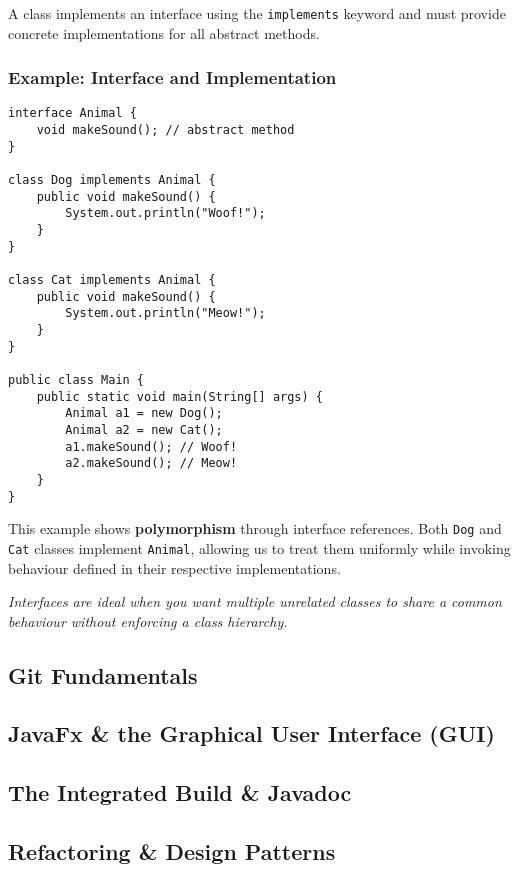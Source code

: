 \documentclass{article}
\begin{document}
A class implements an interface using the \texttt{implements} keyword and must provide concrete implementations for all abstract methods.

\subsubsection*{Example: Interface and Implementation}

\begin{verbatim}
interface Animal {
    void makeSound(); // abstract method
}

class Dog implements Animal {
    public void makeSound() {
        System.out.println("Woof!");
    }
}

class Cat implements Animal {
    public void makeSound() {
        System.out.println("Meow!");
    }
}

public class Main {
    public static void main(String[] args) {
        Animal a1 = new Dog();
        Animal a2 = new Cat();
        a1.makeSound(); // Woof!
        a2.makeSound(); // Meow!
    }
}
\end{verbatim}

This example shows \textbf{polymorphism} through interface references. Both \texttt{Dog} and \texttt{Cat} classes implement \texttt{Animal}, allowing us to treat them uniformly while invoking behaviour defined in their respective implementations.

\medskip
\textit{Interfaces are ideal when you want multiple unrelated classes to share a common behaviour without enforcing a class hierarchy.}



\subsection{Git Fundamentals}

\subsection{JavaFx \& the Graphical User Interface (GUI)}

\subsection{The Integrated Build \& Javadoc}

\subsection{Refactoring \& Design Patterns}
\end{document}
